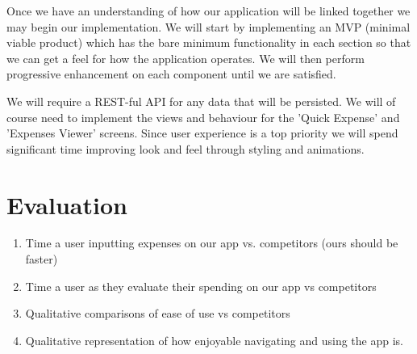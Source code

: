 \documentclass{chi2011}
\begin{document}
Once we have an understanding of how our application will be linked together we
may begin our implementation. We will start by implementing an MVP (minimal
viable product) which has the bare minimum functionality in each section so that
we can get a feel for how the application operates. We will then perform
progressive enhancement on each component until we are satisfied.

We will require a REST-ful API for any data that will be persisted. We will of
course need to implement the views and behaviour for the 'Quick Expense' and
'Expenses Viewer' screens. Since user experience is a top priority we will spend
significant time improving look and feel through styling and animations.

\section{Evaluation}

\begin{enumerate}
    \item Time a user inputting expenses on our app vs. competitors (ours should be faster)
    \item Time a user as they evaluate their spending on our app vs competitors
    \item Qualitative comparisons of ease of use vs competitors
    \item Qualitative representation of how enjoyable navigating and using the app is.
\end{enumerate}



\end{document}
